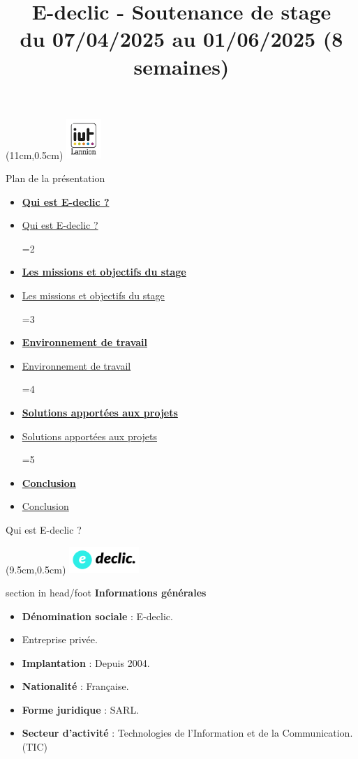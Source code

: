 \documentclass{beamer}
\title[IUT Lannion -- Soutenance Stage]{E-declic - Soutenance de stage \\ \normalsize du 07/04/2025 au 01/06/2025 (8 semaines)}
\author{\NomPrenom}
\institute{IUT de Lannion -- Département Informatique}
\date{\DateSoutenance}
\newcommand{\logoEdeclic}{
	\begin{textblock*}{2cm}(9.5cm,0.5cm)
  		\includegraphics[height=1cm]{../img/logo_e-declic.png}
	\end{textblock*}
}
\newcommand{\planLine}[4]{
  \ifnum#1=#2
    \item \hyperlink{#3}{\textbf{\large #4}}
  \else
    \item \hyperlink{#3}{#4}
  \fi
}
\newcommand{\planSlide}[1]{
  	\begin{frame}{Plan de la présentation}
  		\begin{center}
  			\begin{minipage}{1\textwidth}
				\begin{itemize}
      			\planLine{#1}{1}{organisation}{Qui est E-declic ?}
      			\planLine{#1}{2}{sujet}{Les missions et objectifs du stage}
      			\planLine{#1}{3}{environnement}{Environnement de travail}
      			\planLine{#1}{4}{realisation}{Solutions apportées aux projets}
      			\planLine{#1}{5}{conclusion}{Conclusion}
	    		\end{itemize}
  		\end{minipage}
	\end{center}
	\vfill
	\end{frame}
}
\begin{document}
\begin{frame}[plain]
	\begin{minipage}[t]{0.75\textwidth}
    		\titlepage
  	\end{minipage}
	\begin{textblock*}{2cm}(11cm,0.5cm)
    		\includegraphics[height=1.5cm]{../img/logo_iut.png}
	\end{textblock*}
\end{frame}

\planSlide{1}

\begin{frame}[label=organisation]{Qui est E-declic ?}
	\logoEdeclic

	\begin{beamercolorbox}[wd=\paperwidth,ht=1.5em,dp=0.5em,leftskip=0.5cm]{section in head/foot}
  		\large \textbf{Informations générales}
	\end{beamercolorbox}
	\vspace{0.5em}
	\begin{center}
  		\begin{minipage}{0.9\textwidth}
    			\begin{itemize}
      			\item<1-> \textbf{Dénomination sociale} : E-declic.
      			\item<1-> Entreprise privée.
      			\item<2-> \textbf{Implantation} : Depuis 2004.
				\item<2-> \textbf{Nationalité} : Française.
      			\item<2-> \textbf{Forme juridique} : SARL.
      			\item<3-> \textbf{Secteur d'activité} : Technologies de l'Information et de la Communication. (TIC)
    			\end{itemize}
  		\end{minipage}
	\end{center}
	\vfill
\end{frame}
\end{document}
